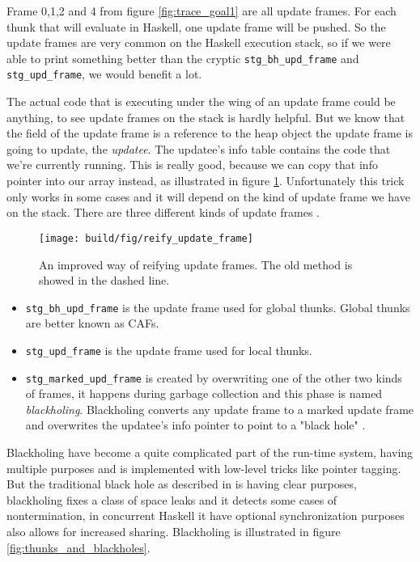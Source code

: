 Frame 0,1,2 and 4 from figure \ref{fig:trace_goal1} are all update
frames. For each thunk that will evaluate in Haskell, one update
frame will be pushed. So the update frames are very common on
the Haskell execution stack, so if we were able to print something better
than the cryptic \texttt{stg\_bh\_upd\_frame} and \texttt{stg\_upd\_frame},
we would benefit a lot. %

The actual code that is executing under the wing of an update frame
could be anything, to see update frames on the stack is hardly helpful.
But we know that the field of the update frame is a reference to the
heap object the update frame is going to update, the \emph{updatee}. The updatee's
info table contains the code that we're currently running.
This is really good, because we can copy that info pointer into our array instead,
as illustrated in figure \ref{fig:reify_update_frame}.
Unfortunately this trick only works in some cases and it will depend on the kind of
update frame we have on the stack. There are three different kinds of
update frames \cite{github_updates_cmm}.

\begin{figure}
\begin{mdframed}
  \texttt{[image: build/fig/reify\_update\_frame]}
  \caption{An improved way of reifying update frames. The old method is
  showed in the dashed line.}
  \label{fig:reify_update_frame}
\end{mdframed}
\end{figure}

\begin{itemize}
  \item
    \texttt{stg\_bh\_upd\_frame} is the update frame used for global
      thunks. Global thunks are better known as CAFs.
  \item
    \texttt{stg\_upd\_frame} is the update frame used for local
  thunks.
  \item
     \texttt{stg\_marked\_upd\_frame} is created
  by overwriting one of the other two kinds of frames, it
  happens during garbage collection and this phase is named
  \emph{blackholing}. Blackholing converts any update frame to a
  marked update frame \cite{github_overwrite_update_frame} and
  overwrites the updatee's info pointer to point to a "black hole"
  \cite{github_overwrite_blackhole}.
\end{itemize}

Blackholing have become a quite complicated part of the run-time system,
having multiple purposes %
and is implemented with low-level tricks like pointer tagging. But the
traditional black hole as described in \cite{jones1992tail} is having
clear purposes, blackholing fixes a class of space leaks and it detects
some cases of nontermination, in concurrent Haskell it have optional
synchronization purposes also allows for increased sharing. Blackholing
is illustrated in figure \ref{fig:thunks_and_blackholes}.

